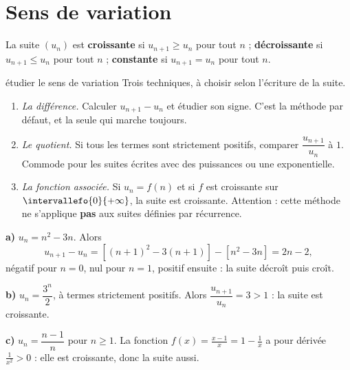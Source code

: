 \section{Sens de variation}

\begin{definition}
La suite $\left(u_{n}\right)$ est \textbf{croissante} si
$u_{n+1} \geq u_{n}$ pour tout $n$ ; \textbf{décroissante} si
$u_{n+1} \leq u_{n}$ pour tout $n$ ; \textbf{constante} si
$u_{n+1} = u_{n}$ pour tout $n$.
\end{definition}

\begin{methode}{étudier le sens de variation}
Trois techniques, à choisir selon l'écriture de la suite.
\begin{enumerate}[label=\textbf{\arabic*.}, leftmargin=*, itemsep=0.15em]
  \item \emph{La différence.} Calculer $u_{n+1}-u_{n}$ et étudier son signe.
        C'est la méthode par défaut, et la seule qui marche toujours.
  \item \emph{Le quotient.} Si tous les termes sont strictement positifs,
        comparer $\dfrac{u_{n+1}}{u_{n}}$ à $1$. Commode pour les suites
        écrites avec des puissances ou une exponentielle.
  \item \emph{La fonction associée.} Si $u_{n} = f(n)$ et si $f$ est
        croissante sur $\intervallefo{0}{+\infty}$, la suite est croissante.
        Attention : cette méthode ne s'applique \textbf{pas} aux suites
        définies par récurrence.
\end{enumerate}
\end{methode}

\begin{exemple}
\textbf{a)} $u_{n} = n^{2}-3n$. Alors
\[
  u_{n+1}-u_{n} = \left[(n+1)^{2}-3(n+1)\right]-\left[n^{2}-3n\right]
  = 2n-2 ,
\]
négatif pour $n = 0$, nul pour $n = 1$, positif ensuite : la suite décroît
puis croît.

\textbf{b)} $u_{n} = \dfrac{3^{n}}{2}$, à termes strictement positifs.
Alors $\dfrac{u_{n+1}}{u_{n}} = 3 > 1$ : la suite est croissante.

\textbf{c)} $u_{n} = \dfrac{n-1}{n}$ pour $n \geq 1$. La fonction
$f(x) = \frac{x-1}{x} = 1-\frac1x$ a pour dérivée $\frac{1}{x^{2}}>0$ : elle
est croissante, donc la suite aussi.
\end{exemple}

